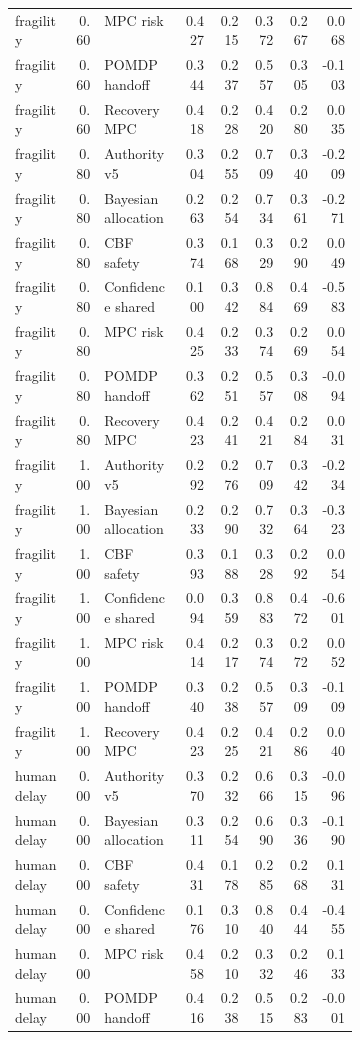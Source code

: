 \documentclass{article}
\begin{document}
\begin{center}
\begin{longtable}{p{0.17\linewidth}rp{0.23\linewidth}rrrrr}
fragility & 0.60 & MPC risk & 0.427 & 0.215 & 0.372 & 0.267 & 0.068\\
fragility & 0.60 & POMDP handoff & 0.344 & 0.237 & 0.557 & 0.305 & -0.103\\
fragility & 0.60 & Recovery MPC & 0.418 & 0.228 & 0.420 & 0.280 & 0.035\\
fragility & 0.80 & Authority v5 & 0.304 & 0.255 & 0.709 & 0.340 & -0.209\\
fragility & 0.80 & Bayesian allocation & 0.263 & 0.254 & 0.734 & 0.361 & -0.271\\
fragility & 0.80 & CBF safety & 0.374 & 0.168 & 0.329 & 0.290 & 0.049\\
fragility & 0.80 & Confidence shared & 0.100 & 0.342 & 0.884 & 0.469 & -0.583\\
fragility & 0.80 & MPC risk & 0.425 & 0.233 & 0.374 & 0.269 & 0.054\\
fragility & 0.80 & POMDP handoff & 0.362 & 0.251 & 0.557 & 0.308 & -0.094\\
fragility & 0.80 & Recovery MPC & 0.423 & 0.241 & 0.421 & 0.284 & 0.031\\
fragility & 1.00 & Authority v5 & 0.292 & 0.276 & 0.709 & 0.342 & -0.234\\
fragility & 1.00 & Bayesian allocation & 0.233 & 0.290 & 0.732 & 0.364 & -0.323\\
fragility & 1.00 & CBF safety & 0.393 & 0.188 & 0.328 & 0.292 & 0.054\\
fragility & 1.00 & Confidence shared & 0.094 & 0.359 & 0.883 & 0.472 & -0.601\\
fragility & 1.00 & MPC risk & 0.414 & 0.217 & 0.374 & 0.272 & 0.052\\
fragility & 1.00 & POMDP handoff & 0.340 & 0.238 & 0.557 & 0.309 & -0.109\\
fragility & 1.00 & Recovery MPC & 0.423 & 0.225 & 0.421 & 0.286 & 0.040\\
human delay & 0.00 & Authority v5 & 0.370 & 0.232 & 0.666 & 0.315 & -0.096\\
human delay & 0.00 & Bayesian allocation & 0.311 & 0.254 & 0.690 & 0.336 & -0.190\\
human delay & 0.00 & CBF safety & 0.431 & 0.178 & 0.285 & 0.268 & 0.131\\
human delay & 0.00 & Confidence shared & 0.176 & 0.310 & 0.840 & 0.444 & -0.455\\
human delay & 0.00 & MPC risk & 0.458 & 0.210 & 0.332 & 0.246 & 0.133\\
human delay & 0.00 & POMDP handoff & 0.416 & 0.238 & 0.515 & 0.283 & -0.001\\

\end{longtable}
\end{center}
\end{document}

